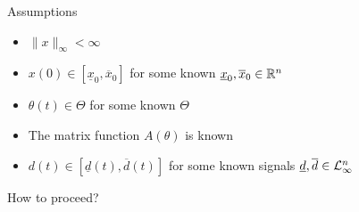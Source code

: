\documentclass[slideopt,A4,showboxes,svgnames]{beamer}
\begin{document}
\begin{frame}{Assumptions}
\begin{assumption}
	\begin{itemize}
		\item $\|x\|_{\infty} < \infty$
		\item $x(0)\in[\underline{x}_{0},\overline{x}_{0}]$ for some \alert{known} $\underline{x}_{0},\overline{x}_{0}\in\mathbb{R}^{n}$
	\end{itemize}
\end{assumption}
\pause
\begin{assumption}
	\begin{itemize}
		\item $\theta(t)\in\Theta$ for some \alert{known} $\Theta$
		\item The matrix function $A(\theta)$ is \alert{known}
	\end{itemize}
	\end{assumption}
\pause
\begin{assumption}
	\begin{itemize}
		\item $d(t)\in[\underline{d}(t),\overline{d}(t)]$ for some \alert{known} signals $\underline{d},\overline{d}\in\mathcal{L}_{\infty}^{n}$
	\end{itemize}
\end{assumption}

\begin{flushright}
	How to proceed?
\end{flushright}
\end{frame}
\end{document}
